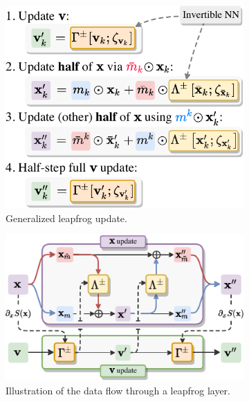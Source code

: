 \documentclass[a4paper,11pt]{article}
\begin{document}
\begin{figure}[htpb]
    \centering
    \begin{subfigure}[t]{0.40\linewidth}
        \includegraphics[width=\linewidth]{assets/update_steps.pdf}
        \caption{\label{subfig:updates}Generalized leapfrog update.}
    \end{subfigure}
    \hfill
    \begin{subfigure}[t]{0.55\linewidth}
        \includegraphics[width=\linewidth]{assets/leapfrog_layer.pdf}
        \caption{\label{subfig:lfupdate}Illustration of the data flow
        through a leapfrog layer.}
    \end{subfigure}
    \begin{subfigure}[t]{\linewidth}

\end{subfigure}
\end{figure}
\end{document}
